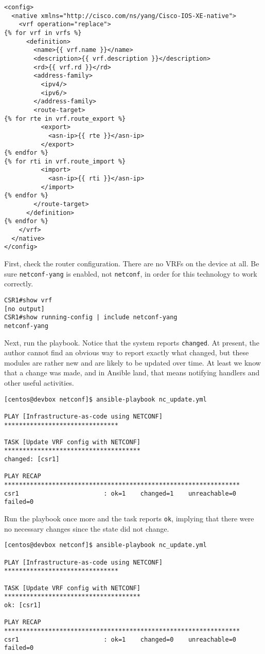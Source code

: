 \begin{verbatim}
<config>
  <native xmlns="http://cisco.com/ns/yang/Cisco-IOS-XE-native">
    <vrf operation="replace">
{% for vrf in vrfs %}
      <definition>
        <name>{{ vrf.name }}</name>
        <description>{{ vrf.description }}</description>
        <rd>{{ vrf.rd }}</rd>
        <address-family>
          <ipv4/>
          <ipv6/>
        </address-family>
        <route-target>
{% for rte in vrf.route_export %}
          <export>
            <asn-ip>{{ rte }}</asn-ip>
          </export>
{% endfor %}
{% for rti in vrf.route_import %}
          <import>
            <asn-ip>{{ rti }}</asn-ip>
          </import>
{% endfor %}
        </route-target>
      </definition>
{% endfor %}
    </vrf>
  </native>
</config>
\end{verbatim}

First, check the router configuration. There are no VRFs on the device at all.
Be sure \verb|netconf-yang| is enabled, not \verb|netconf|, in order for
this technology to work correctly.

\begin{verbatim}
CSR1#show vrf
[no output]
CSR1#show running-config | include netconf-yang
netconf-yang
\end{verbatim}

Next, run the playbook. Notice that the system reports \verb|changed|. At present,
the author cannot find an obvious way to report exactly what changed, but these
modules are rather new and are likely to be updated over time. At least we know
that a change was made, and in Ansible land, that means notifying handlers and
other useful activities.

\begin{verbatim}
[centos@devbox netconf]$ ansible-playbook nc_update.yml

PLAY [Infrastructure-as-code using NETCONF] *******************************

TASK [Update VRF config with NETCONF] *************************************
changed: [csr1]

PLAY RECAP ****************************************************************
csr1                       : ok=1    changed=1    unreachable=0    failed=0
\end{verbatim}

Run the playbook once more and the task reports \verb|ok|, implying that there
were no necessary changes since the state did not change.

\begin{verbatim}
[centos@devbox netconf]$ ansible-playbook nc_update.yml

PLAY [Infrastructure-as-code using NETCONF] *******************************

TASK [Update VRF config with NETCONF] *************************************
ok: [csr1]

PLAY RECAP ****************************************************************
csr1                       : ok=1    changed=0    unreachable=0    failed=0
\end{verbatim}

